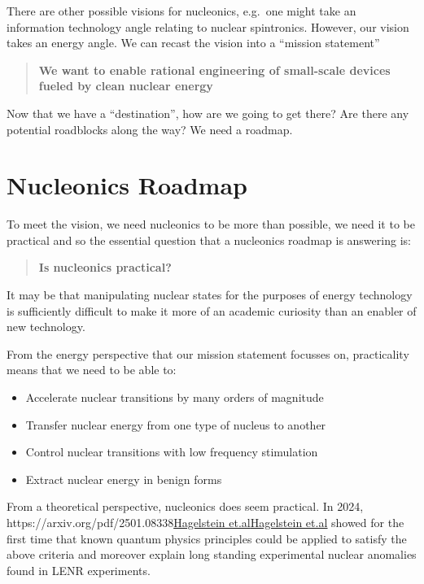 \documentclass[
]{article}
\let\oldhref\href
\renewcommand{\href}[2]{\ifx#1\urlprefix\oldhref{#1}{#2}\else\uline{\oldhref{#1}{#2}}\fi}
\renewcommand{\[}{\begin{equation}}
\renewcommand{\]}{\end{equation}}
\providecommand{\tightlist}{%
  \setlength{\itemsep}{0pt}\setlength{\parskip}{0pt}}
\begin{document}
There are other possible visions for nucleonics, e.g.~one might take an
information technology angle relating to nuclear spintronics. However,
our vision takes an energy angle. We can recast the vision into a
``mission statement''

\begin{quote}
\textbf{We want to enable rational engineering of small-scale devices
fueled by clean nuclear energy}
\end{quote}

Now that we have a ``destination'', how are we going to get there? Are
there any potential roadblocks along the way? We need a roadmap.

\section{Nucleonics Roadmap}\label{nucleonics-roadmap}

To meet the vision, we need nucleonics to be more than possible, we need
it to be practical and so the essential question that a nucleonics
roadmap is answering is:

\begin{quote}
\textbf{Is nucleonics practical?}
\end{quote}

It may be that manipulating nuclear states for the purposes of energy
technology is sufficiently difficult to make it more of an academic
curiosity than an enabler of new technology.

From the energy perspective that our mission statement focusses on,
practicality means that we need to be able to:

\begin{itemize}
\tightlist
\item
  Accelerate nuclear transitions by many orders of magnitude
\item
  Transfer nuclear energy from one type of nucleus to another
\item
  Control nuclear transitions with low frequency stimulation
\item
  Extract nuclear energy in benign forms
\end{itemize}

From a theoretical perspective, nucleonics does seem practical. In 2024,
\href{https://arxiv.org/pdf/2501.08338}{Hagelstein et.al} showed for the
first time that known quantum physics principles could be applied to
satisfy the above criteria and moreover explain long standing
experimental nuclear anomalies found in LENR experiments.
\end{document}
